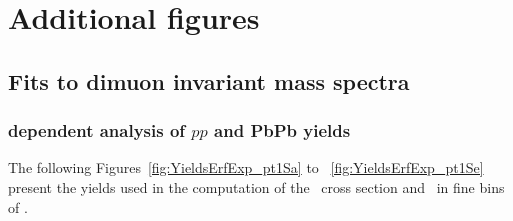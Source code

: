 \chapter{Additional figures}
\label{sec:figs}
\section{Fits to dimuon invariant mass spectra}

\subsection{\texorpdfstring{\pt}{pT} dependent analysis of $pp$ and
  PbPb yields}
\label{sec:figs_pt}
The following Figures~\ref{fig:YieldsErfExp_pt1Sa} to
~\ref{fig:YieldsErfExp_pt1Se} present the yields used in the
computation of the \PgUa\ cross section and \RAA\ in fine bins of \pt.

